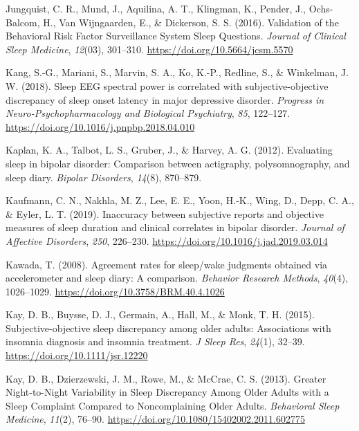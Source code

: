 \documentclass[
]{article}
\newlength{\cslhangindent}
\newenvironment{CSLReferences}[2] %
 {\begin{list}{}{%
  \setlength{\itemindent}{0pt}
  \setlength{\leftmargin}{0pt}
  \setlength{\parsep}{0pt}
  \ifodd #1
   \setlength{\leftmargin}{\cslhangindent}
   \setlength{\itemindent}{-1\cslhangindent}
  \fi
  \setlength{\itemsep}{#2\baselineskip}}}
 {\end{list}}
\begin{document}
\begin{CSLReferences}{1}{0}
Jungquist, C. R., Mund, J., Aquilina, A. T., Klingman, K., Pender, J., Ochs-Balcom, H., Van Wijngaarden, E., \& Dickerson, S. S. (2016). Validation of the {Behavioral} {Risk} {Factor} {Surveillance} {System} {Sleep} {Questions}. \emph{Journal of Clinical Sleep Medicine}, \emph{12}(03), 301--310. \url{https://doi.org/10.5664/jcsm.5570}

Kang, S.-G., Mariani, S., Marvin, S. A., Ko, K.-P., Redline, S., \& Winkelman, J. W. (2018). Sleep {EEG} spectral power is correlated with subjective-objective discrepancy of sleep onset latency in major depressive disorder. \emph{Progress in Neuro-Psychopharmacology and Biological Psychiatry}, \emph{85}, 122--127. \url{https://doi.org/10.1016/j.pnpbp.2018.04.010}

Kaplan, K. A., Talbot, L. S., Gruber, J., \& Harvey, A. G. (2012). Evaluating sleep in bipolar disorder: Comparison between actigraphy, polysomnography, and sleep diary. \emph{Bipolar Disorders}, \emph{14}(8), 870--879.

Kaufmann, C. N., Nakhla, M. Z., Lee, E. E., Yoon, H.-K., Wing, D., Depp, C. A., \& Eyler, L. T. (2019). Inaccuracy between subjective reports and objective measures of sleep duration and clinical correlates in bipolar disorder. \emph{Journal of Affective Disorders}, \emph{250}, 226--230. \url{https://doi.org/10.1016/j.jad.2019.03.014}

Kawada, T. (2008). Agreement rates for sleep/wake judgments obtained via accelerometer and sleep diary: {A} comparison. \emph{Behavior Research Methods}, \emph{40}(4), 1026--1029. \url{https://doi.org/10.3758/BRM.40.4.1026}

Kay, D. B., Buysse, D. J., Germain, A., Hall, M., \& Monk, T. H. (2015). Subjective-objective sleep discrepancy among older adults: Associations with insomnia diagnosis and insomnia treatment. \emph{J Sleep Res}, \emph{24}(1), 32--39. \url{https://doi.org/10.1111/jsr.12220}

Kay, D. B., Dzierzewski, J. M., Rowe, M., \& McCrae, C. S. (2013). Greater {Night}-to-{Night} {Variability} in {Sleep} {Discrepancy} {Among} {Older} {Adults} with a {Sleep} {Complaint} {Compared} to {Noncomplaining} {Older} {Adults}. \emph{Behavioral Sleep Medicine}, \emph{11}(2), 76--90. \url{https://doi.org/10.1080/15402002.2011.602775}


\end{CSLReferences}
\end{document}
